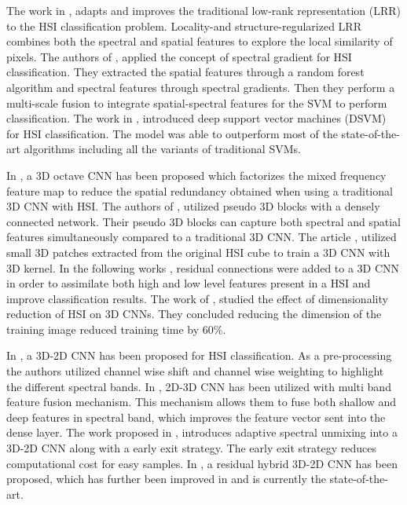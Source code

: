 \documentclass[journal]{IEEEtran}
\begin{document}
The work in \cite{8447427}, adapts and improves the traditional low-rank representation (LRR) to the HSI classification problem. Locality-and structure-regularized LRR combines both the spectral and spatial features to explore the local similarity of pixels. The authors of \cite{CHUNHUI201861}, applied the concept of spectral gradient for HSI classification. They extracted the spatial features through a random forest algorithm and spectral features through spectral gradients. Then they perform a multi-scale fusion to integrate spatial-spectral features for the SVM to perform classification. The work in \cite{OKWUASHI2020107298}, introduced deep support vector machines (DSVM) for HSI classification. The model was able to outperform most of the state-of-the-art algorithms including all the variants of traditional SVMs. %

In \cite{xu2020csa}, a 3D octave CNN has been proposed which factorizes the mixed frequency feature map to reduce the spatial redundancy obtained when using a traditional 3D CNN with HSI. The authors of \cite{8851917}, utilized pseudo 3D blocks with a densely connected network. Their pseudo 3D blocks can capture both spectral and spatial features simultaneously compared to a traditional 3D CNN. The article \cite{ahmad2020fast}, utilized small 3D patches extracted from the original HSI cube to train a 3D CNN with 3D kernel. In the following works \cite{8061020}, residual connections were added to a 3D CNN in order to assimilate both high and low level features present in a HSI and improve classification results. The work of \cite{10.1007/978-3-030-14118-9_2}, studied the effect of dimensionality reduction of HSI on 3D CNNs. They concluded reducing the dimension of the training image reduced training time by 60\%. 

In \cite{9103280}, a 3D-2D CNN has been proposed for HSI classification. As a pre-processing the authors utilized channel wise shift and channel wise weighting to highlight the different spectral bands. In \cite{9200676}, 2D-3D CNN has been utilized with multi band feature fusion mechanism. This mechanism allows them to fuse both shallow and deep features in spectral band, which improves the feature vector sent into the dense layer.%
The work proposed in \cite{fang2020combining}, introduces adaptive spectral unmixing into a 3D-2D CNN along with a early exit strategy. The early exit strategy reduces computational cost for easy samples. In \cite{feng2019learning}, a residual hybrid 3D-2D CNN has been proposed, which has further been improved in \cite{8736016} and is currently the state-of-the-art.
\end{document}
